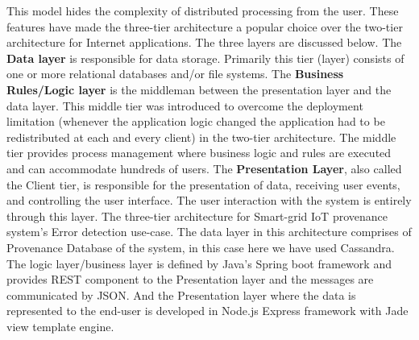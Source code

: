     This  model hides  the  complexity  of  distributed  processing  from  the  user.  These features   have   made   the   three-tier   architecture   a   popular choice over the two-tier architecture for Internet applications. The three layers are discussed below.
    \newline
    \newline
    The \textbf{Data layer} is  responsible  for  data  storage.  Primarily  this  tier  (layer)  consists of one or more relational databases and/or file systems.
    \newline
    \newline
    The \textbf{Business Rules/Logic layer} is the middleman between the presentation layer and  the  data  layer. This  middle  tier  was  introduced  to  overcome  the  deployment limitation (whenever
    the application logic changed the application had to be redistributed at  each  and  every  client)  in  the  two-tier  architecture.  The  middle  tier  provides  process
    management where business logic and rules are executed and can accommodate hundreds of  users.
    \newline
    \newline
    The \textbf{Presentation  Layer},  also  called  the Client  tier,  is responsible  for the presentation  of  data,  receiving  user  events,  and  controlling  the  user  interface.  The  user
    interaction with the system is entirely through this layer.
    \newline
    \newline
    The three-tier architecture for Smart-grid IoT provenance system's Error detection use-case. The data layer in this architecture comprises of Provenance Database of the system, in this case here we have used Cassandra. The logic layer/business layer is defined by Java's Spring boot framework and provides REST component to the Presentation layer and the messages are communicated by JSON. And the Presentation layer where the data is represented to the end-user is developed in Node.js Express framework with Jade view template engine.
